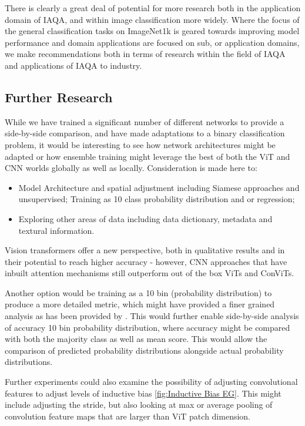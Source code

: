 \label{sec:Future Perspectives}

There is clearly a great deal of potential for more research both in the application domain of IAQA, and within image classification more widely. Where the focus of the general classification tasks on ImageNet1k is geared towards improving model performance and domain applications are focused on sub, or application domains, we make recommendations both in terms of research within the field of IAQA and applications of IAQA to industry. 

\subsection{Further Research}
\label{sec:further research}

While we have trained a significant number of different networks to provide a side-by-side comparison, and have made adaptations to a binary classification problem, it would be interesting to see how network architectures might be adapted or how ensemble training might leverage the best of both the ViT and CNN worlds globally as well as locally. Consideration is made here to: 

\begin{itemize}
    \item Model Architecture and spatial adjustment including Siamese approaches and unsupervised;
    \itme Training as 10 class probability distribution and or regression;
    \item Exploring other areas of data including data dictionary, metadata and textural information. 
    \end{itemize}


Vision transformers offer a new perspective, both in qualitative results and in their potential to reach higher accuracy - however, CNN approaches that have inbuilt attention mechanisms still outperform out of the box ViTs and ConViTs. 

Another option would be training as a 10 bin (probability distribution) to produce a more detailed metric, which might have provided a finer grained analysis as has been provided by \cite{Zhang2021d}. This would further enable side-by-side analysis of accuracy 10 bin probability distribution, where accuracy might be compared with both the majority class as well as mean score. This would allow the comparison of predicted probability distributions alongside actual probability distributions.

Further experiments could also examine the possibility of adjusting convolutional features to adjust levels of inductive bias \ref{fig:Inductive Bias EG}. This might include adjusting the stride, but also looking at max or average pooling of convolution feature maps that are larger than ViT patch dimension. 

